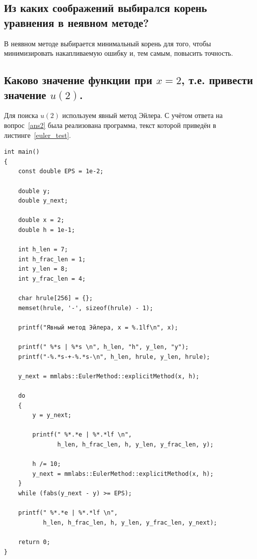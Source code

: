 \subsection{Из каких соображений выбирался корень уравнения в неявном методе?}
В неявном методе выбирается минимальный корень для того, чтобы минимизировать накапливаемую ошибку и, тем самым, повысить точность.

\subsection{Каково значение функции при $x=2$, т.е. привести значение $u(2)$.}
Для поиска $u(2)$ используем явный метод Эйлера. С учётом ответа на вопрос~\ref{ans2} была реализована программа, текст которой приведён в листинге~\ref{euler_test}.
\begin{lstlisting}[caption={Поиск $u(2)$}, label={euler_test}]
int main()
{
    const double EPS = 1e-2;

    double y;
    double y_next;

    double x = 2;
    double h = 1e-1;

    int h_len = 7;
    int h_frac_len = 1;
    int y_len = 8;
    int y_frac_len = 4;

    char hrule[256] = {};
    memset(hrule, '-', sizeof(hrule) - 1);

    printf("Явный метод Эйлера, x = %.1lf\n", x);

    printf(" %*s | %*s \n", h_len, "h", y_len, "y");
    printf("-%.*s-+-%.*s-\n", h_len, hrule, y_len, hrule);

    y_next = mmlabs::EulerMethod::explicitMethod(x, h);

    do
    {
        y = y_next;

        printf(" %*.*e | %*.*lf \n",
               h_len, h_frac_len, h, y_len, y_frac_len, y);

        h /= 10;
        y_next = mmlabs::EulerMethod::explicitMethod(x, h);
    }
    while (fabs(y_next - y) >= EPS);

    printf(" %*.*e | %*.*lf \n",
           h_len, h_frac_len, h, y_len, y_frac_len, y_next);

    return 0;
}
\end{lstlisting}

